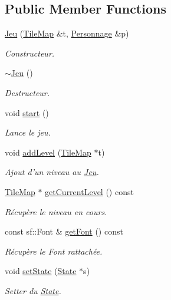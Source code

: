 \subsection*{Public Member Functions}
\begin{DoxyCompactItemize}
\item 
\hyperlink{class_jeu_ab1215a7dd0ff35aab33aa75d35be033d}{Jeu} (\hyperlink{class_tile_map}{Tile\+Map} \&t, \hyperlink{class_personnage}{Personnage} \&p)
\begin{DoxyCompactList}\small\item\em Constructeur. \end{DoxyCompactList}\item 
\hyperlink{class_jeu_a9cd19e73df169d7f09397be61ba8548c}{$\sim$\+Jeu} ()
\begin{DoxyCompactList}\small\item\em Destructeur. \end{DoxyCompactList}\item 
void \hyperlink{class_jeu_ae576e644696381ad0a1c165c6dc789b4}{start} ()
\begin{DoxyCompactList}\small\item\em Lance le jeu. \end{DoxyCompactList}\item 
void \hyperlink{class_jeu_abf2ef17f214900d6a862d9943f2f15c7}{add\+Level} (\hyperlink{class_tile_map}{Tile\+Map} $\ast$t)
\begin{DoxyCompactList}\small\item\em Ajout d'un niveau au \hyperlink{class_jeu}{Jeu}. \end{DoxyCompactList}\item 
\hyperlink{class_tile_map}{Tile\+Map} $\ast$ \hyperlink{class_jeu_ace73ca775ed5e7a13560a541b0c2b8a1}{get\+Current\+Level} () const 
\begin{DoxyCompactList}\small\item\em Récupère le niveau en cours. \end{DoxyCompactList}\item 
const sf\+::\+Font \& \hyperlink{class_jeu_afeedcd4eab224f8bfbd3d34593a06297}{get\+Font} () const 
\begin{DoxyCompactList}\small\item\em Récupère le Font rattachée. \end{DoxyCompactList}\item 
void \hyperlink{class_jeu_ab1e361ec100fae4090ffb062f797b7b5}{set\+State} (\hyperlink{class_state}{State} $\ast$s)
\begin{DoxyCompactList}\small\item\em Setter du \hyperlink{class_state}{State}. \end{DoxyCompactList}\item 

\end{DoxyCompactItemize}
